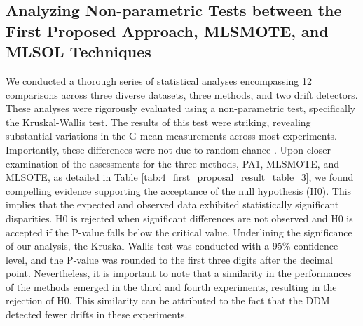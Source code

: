 \begin{table}[h!]
  \centering
  \caption{Runtimes (in seconds) Comparison of PA1, MLSMOTE, and MLSOL.}
  \label{tab:4_first_proposal_result_table_2}
  \end{table}

\subsection{Analyzing Non-parametric Tests between the First Proposed Approach, MLSMOTE, and MLSOL Techniques}
We conducted a thorough series of statistical analyses encompassing 12 comparisons across three diverse datasets, three methods, and two drift detectors. These analyses were rigorously evaluated using a non-parametric test, specifically the Kruskal-Wallis test. The results of this test were striking, revealing substantial variations in the G-mean measurements across most experiments. Importantly, these differences were not due to random chance \cite{yamada2013change}. Upon closer examination of the assessments for the three methods, PA1, MLSMOTE, and MLSOTE, as detailed in Table \ref{tab:4_first_proposal_result_table_3}, we found compelling evidence supporting the acceptance of the null hypothesis (H0).
This implies that the expected and observed data exhibited statistically significant disparities. H0 is rejected when significant differences are not observed and H0 is accepted if the P-value falls below the critical value. Underlining the significance of our analysis, the Kruskal-Wallis test was conducted with a 95\% confidence level, and the P-value was rounded to the first three digits after the decimal point. Nevertheless, it is important to note that a similarity in the performances of the methods emerged in the third and fourth experiments, resulting in the rejection of H0. This similarity can be attributed to the fact that the DDM detected fewer drifts in these experiments.


